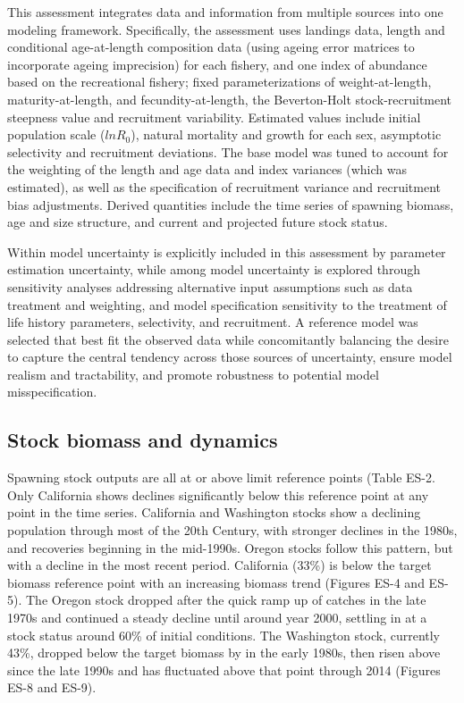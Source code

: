 \documentclass[11pt,
  english,
  letterpaper,
]{article}
\begin{document}
This assessment integrates data and information from multiple sources into one modeling framework. Specifically, the assessment uses landings data, length and conditional age-at-length composition data (using ageing error matrices to incorporate ageing imprecision) for each fishery, and one index of abundance based on the recreational fishery; fixed parameterizations of weight-at-length, maturity-at-length, and fecundity-at-length, the Beverton-Holt stock-recruitment steepness value and recruitment variability. Estimated values include initial population scale (\(lnR_0\)), natural mortality and growth for each sex, asymptotic selectivity and recruitment deviations. The base model was tuned to account for the weighting of the length and age data and index variances (which was estimated), as well as the specification of recruitment variance and recruitment bias adjustments. Derived quantities include the time series of spawning biomass, age and size structure, and current and projected future stock status.

Within model uncertainty is explicitly included in this assessment by parameter estimation uncertainty, while among model uncertainty is explored through sensitivity analyses addressing alternative input assumptions such as data treatment and weighting, and model specification sensitivity to the treatment of life history parameters, selectivity, and recruitment. A reference model was selected that best fit the observed data while concomitantly balancing the desire to capture the central tendency across those sources of uncertainty, ensure model realism and tractability, and promote robustness to potential model misspecification.

\hypertarget{stock-biomass-and-dynamics}{%
\subsection*{Stock biomass and dynamics}\label{stock-biomass-and-dynamics}}

Spawning stock outputs are all at or above limit reference points (Table ES-2. Only California shows declines significantly below this reference point at any point in the time series. California and Washington stocks show a declining population through most of the 20th Century, with stronger declines in the 1980s, and recoveries beginning in the mid-1990s. Oregon stocks follow this pattern, but with a decline in the most recent period. California (33\%) is below the target biomass reference point with an increasing biomass trend (Figures ES-4 and ES-5). The Oregon stock dropped after the quick ramp up of catches in the late 1970s and continued a steady decline until around year 2000, settling in at a stock status around 60\% of initial conditions. The Washington stock, currently 43\%, dropped below the target biomass by in the early 1980s, then risen above since the late 1990s and has fluctuated above that point through 2014 (Figures ES-8 and ES-9).
\end{document}
